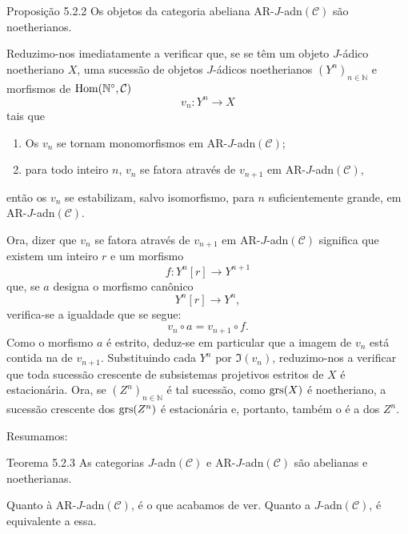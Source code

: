 \begin{statement}{Proposição 5.2.2}
Os objetos da categoria abeliana AR-\(J\)-adn\((\mathcal C)\) são noetherianos.
\end{statement}

\begin{prooftext}
Reduzimo-nos imediatamente a verificar que, se se têm um objeto \(J\)-ádico noetheriano \(X\), uma sucessão de objetos \(J\)-ádicos noetherianos \((Y^n)_{n\in\mathbb N}\) e morfismos de \(\operatorname{Hom}(\mathbb N^\circ,\mathcal C)\)
\[
v_n:Y^n\longrightarrow X
\]
tais que
\begin{enumerate}[label=\textup{(\roman*)}]
\item Os \(v_n\) se tornam monomorfismos em AR-\(J\)-adn\((\mathcal C)\);
\item para todo inteiro \(n\), \(v_n\) se fatora através de \(v_{n+1}\) em AR-\(J\)-adn\((\mathcal C)\),
\end{enumerate}
então os \(v_n\) se estabilizam, salvo isomorfismo, para \(n\) suficientemente grande, em AR-\(J\)-adn\((\mathcal C)\).

Ora, dizer que \(v_n\) se fatora através de \(v_{n+1}\) em AR-\(J\)-adn\((\mathcal C)\) significa que existem um inteiro \(r\) e um morfismo
\[
f:Y^n[r]\longrightarrow Y^{n+1}
\]
que, se \(a\) designa o morfismo canônico
\[
Y^n[r]\longrightarrow Y^n,
\]
verifica-se a igualdade que se segue:
\[
v_n\circ a=v_{n+1}\circ f .
\]
Como o morfismo \(a\) é estrito, deduz-se em particular que a imagem de \(v_n\) está contida na de \(v_{n+1}\). Substituindo cada \(Y^n\) por \(\Im(v_n)\), reduzimo-nos a verificar que toda sucessão crescente de subsistemas projetivos estritos de \(X\) é estacionária. Ora, se \((Z^n)_{n\in\mathbb N}\) é tal sucessão, como \(\operatorname{grs}(X)\) é noetheriano, a sucessão crescente dos \(\operatorname{grs}(Z^n)\) é estacionária e, portanto, também o é a dos \(Z^n\).
\end{prooftext}

Resumamos:

\begin{statement}{Teorema 5.2.3}
As categorias \(J\)-adn\((\mathcal C)\) e AR-\(J\)-adn\((\mathcal C)\) são abelianas e noetherianas.
\end{statement}

Quanto à AR-\(J\)-adn\((\mathcal C)\), é o que acabamos de ver. Quanto a \(J\)-adn\((\mathcal C)\), é equivalente a essa.
